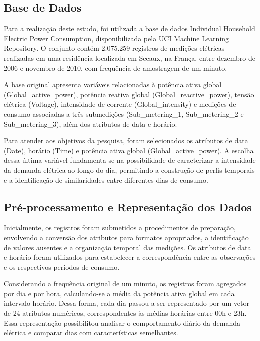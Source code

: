 \documentclass[lettersize,journal]{IEEEtran}
\begin{document}
\subsection{Base de Dados}
Para a realização deste estudo, foi utilizada a base de dados Individual Household Electric Power Consumption, disponibilizada pela UCI Machine Learning Repository. O conjunto contém 2.075.259 registros de medições elétricas realizadas em uma residência localizada em Sceaux, na França, entre dezembro de 2006 e novembro de 2010, com frequência de amostragem de um minuto.

A base original apresenta variáveis relacionadas à potência ativa global (Global\_active\_power), potência reativa global (Global\_reactive\_power), tensão elétrica (Voltage), intensidade de corrente (Global\_intensity) e medições de consumo associadas a três submedições (Sub\_metering\_1, Sub\_metering\_2 e Sub\_metering\_3), além dos atributos de data e horário.

Para atender aos objetivos da pesquisa, foram selecionados os atributos de data (Date), horário (Time) e potência ativa global (Global\_active\_power). A escolha dessa última variável fundamenta-se na possibilidade de caracterizar a intensidade da demanda elétrica ao longo do dia, permitindo a construção de perfis temporais e a identificação de similaridades entre diferentes dias de consumo.


\subsection{Pré-processamento e Representação dos Dados}




Inicialmente, os registros foram submetidos a procedimentos de preparação, envolvendo a conversão dos atributos para formatos apropriados, a identificação de valores ausentes e a organização temporal das medições. Os atributos de data e horário foram utilizados para estabelecer a correspondência entre as observações e os respectivos períodos de consumo.

Considerando a frequência original de um minuto, os registros foram agregados por dia e por hora, calculando-se a média da potência ativa global em cada intervalo horário. Dessa forma, cada dia passou a ser representado por um vetor de 24 atributos numéricos, correspondentes às médias horárias entre 00h e 23h. Essa representação possibilitou analisar o comportamento diário da demanda elétrica e comparar dias com características semelhantes.
\end{document}
